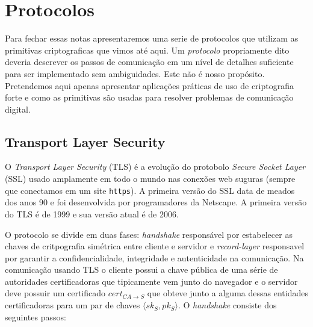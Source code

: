 \chapter{Protocolos}
\label{cha:protocolos}

Para fechar essas notas apresentaremos uma serie de protocolos que utilizam as primitivas criptograficas que vimos até aqui.
Um {\em protocolo} propriamente dito deveria descrever os passos de comunicação em um nível de detalhes suficiente para ser implementado sem ambiguidades.
Este não é nosso propósito.
Pretendemos aqui apenas apresentar aplicações práticas de uso de criptografia forte e como as primitivas são usadas para resolver problemas de comunicação digital.

\section{Transport Layer Security}
\label{sec:tls}

O {\em Transport Layer Security} (TLS) é a evolução do protobolo {\em Secure Socket Layer} (SSL) usado amplamente em todo o mundo nas conexões web suguras (sempre que conectamos em um site {\tt https}).
A primeira versão do SSL data de meados dos anos 90 e foi desenvolvida por programadores da Netscape.
A primeira versão do TLS é de 1999 e sua versão atual é de 2006.

O protocolo se divide em duas fases: {\em handshake} responsável por estabelecer as chaves de critpografia simétrica entre cliente e servidor e {\em record-layer} responsavel por garantir a confidencialidade, integridade e autenticidade na comunicação. 
Na comunicação usando TLS o cliente possui a chave pública de uma série de autoridades certificadoras que tipicamente vem junto do navegador e o servidor deve possuir um certificado $cert_{CA \to S}$ que obteve junto a alguma dessas entidades certificadoras para um par de chaves $\langle sk_S, pk_S \rangle$.
O {\em handshake} consiste dos seguintes passos:

